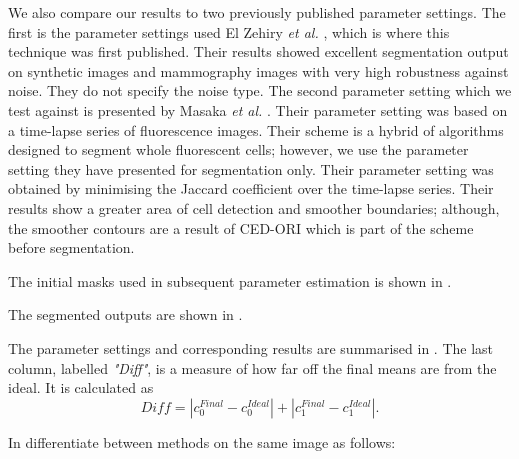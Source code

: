 We also compare our results  to two previously published parameter settings.
The first is the parameter settings used El Zehiry \textit{et al.} \citep{ElZehiry2007}, which is where this technique was first published. Their results showed excellent segmentation output on synthetic images and mammography images with very high robustness against noise. They do not specify the noise type.
The second parameter setting which we test against is presented by Masaka \textit{et al.} \citep{Maska2013}. Their parameter setting was based on a time-lapse series of fluorescence images. Their scheme is a hybrid of algorithms designed to segment whole fluorescent cells; however, we use the parameter setting they have presented for segmentation only. Their parameter setting was obtained by minimising the Jaccard coefficient over the time-lapse series. Their results show a greater area of cell detection and smoother boundaries; although, the smoother contours are a result of CED-ORI \citep{Weickert2002} which is part of the scheme before segmentation.

The initial masks used in subsequent parameter estimation is shown in .

The segmented outputs are shown in .

The parameter settings and corresponding results are summarised in . The last column, labelled \textit{"Diff"}, is a measure of how far off the final means are from the ideal. It is calculated as 
\begin{equation*}
	Diff = |c_{0}^{Final}-c_{0}^{Ideal}| + |c_{1}^{Final}-c_{1}^{Ideal}|.
\end{equation*}

In  differentiate between methods on the same image as follows:

